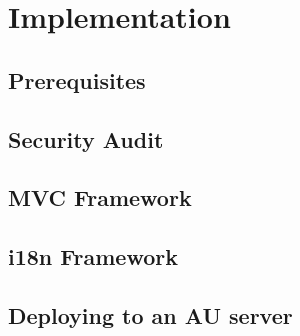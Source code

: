 \chapter{Implementation}

	\section{Prerequisites}
	\label{sec:prerequisites}
	
	\section{Security Audit}
	\label{sec:securityaudit}
	
	\section{\acl{MVC} Framework}
	\label{sec:mvcframework}
	
	\section{\acl{i18n} Framework}
	\label{sec:i18nframework}
	
	\section{Deploying to an \ac{AU} server}
	\label{sec:auserver}
	